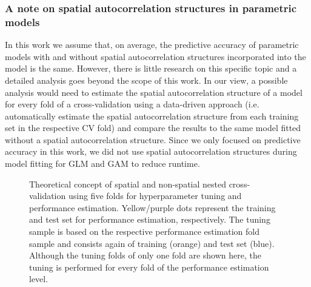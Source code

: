 \documentclass[review]{elsarticle}
\begin{document}
\subsubsection{A note on spatial autocorrelation structures in parametric models}
In this work we assume that, on average, the predictive accuracy of parametric models with and without spatial autocorrelation structures incorporated into the model is the same.
However, there is little research on this specific topic \citep{Dormann2007b, Mets2017} and a detailed analysis goes beyond the scope of this work.
In our view, a possible analysis would need to estimate the spatial autocorrelation structure of a model for every fold of a cross-validation using a data-driven approach (i.e. automatically estimate the spatial autocorrelation structure from each training set in the respective CV fold) and compare the results to the same model fitted without a spatial autocorrelation structure.
Since we only focused on predictive accuracy in this work, we did not use spatial autocorrelation structures during model fitting for \ac{GLM} and \ac{GAM} to reduce runtime.

\begin{figure} [t!]
	\begin{center}
		\caption[]{Theoretical concept of spatial and non-spatial nested cross-validation using five folds for hyperparameter tuning and performance estimation.
			Yellow/purple dots represent the training and test set for performance estimation, respectively.
			The tuning sample is based on the respective performance estimation fold sample and consists again of training (orange) and test set (blue).
			Although the tuning folds of only one fold are shown here, the tuning is performed for every fold of the performance estimation level.}
		\label{fig:nested_cv}
	\end{center}
\end{figure}
\end{document}
